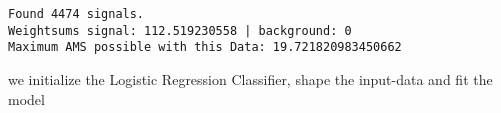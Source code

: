 \par\vspace{1\smallerfontscale}%
    \begin{addmargin}[\cellleftmargin]{0em}%
    {\smaller%
    \vspace{-1\smallerfontscale}%
    
    \begin{Verbatim}[commandchars=\\\{\}]
Found 4474 signals.
Weightsums signal: 112.519230558 | background: 0
Maximum AMS possible with this Data: 19.721820983450662
    \end{Verbatim}
}%
    \end{addmargin}%
    we initialize the Logistic Regression Classifier, shape the input-data
and fit the model


